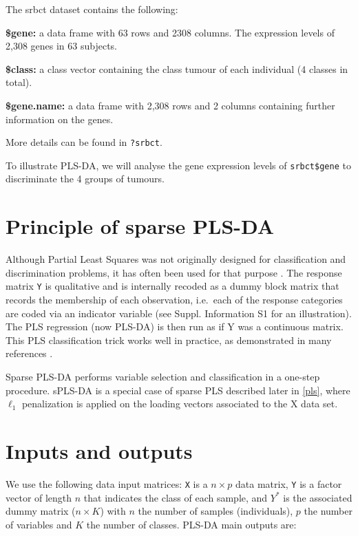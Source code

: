 \documentclass[]{book}
\begin{document}
The srbct dataset contains the following:

\textbf{\$gene:} a data frame with 63 rows and 2308 columns. The expression levels of 2,308 genes in 63 subjects.

\textbf{\$class:} a class vector containing the class tumour of each individual (4 classes in total).

\textbf{\$gene.name:} a data frame with 2,308 rows and 2 columns containing further information on the genes.

More details can be found in \texttt{?srbct}.

To illustrate PLS-DA, we will analyse the gene expression levels of \texttt{srbct\$gene} to discriminate the 4 groups of tumours.

\hypertarget{principle-of-sparse-pls-da}{%
\section{Principle of sparse PLS-DA}\label{principle-of-sparse-pls-da}}

Although Partial Least Squares was not originally designed for classification and discrimination problems, it has often been used for that purpose \citep{Ngu02a, Tan04}. The response matrix \texttt{Y} is qualitative and is internally recoded as a dummy block matrix that records the membership of each observation, i.e.~each of the response categories are coded via an indicator variable (see \citep{mixomics} Suppl. Information S1 for an illustration). The PLS regression (now PLS-DA) is then run as if Y was a continuous matrix. This PLS classification trick works well in practice, as demonstrated in many references \citep{Bar03, Ngu02a, Bou07, Chung10}.

Sparse PLS-DA \citep{Lec11} performs variable selection and classification in a one-step procedure. sPLS-DA is a special case of sparse PLS described later in \ref{pls}, where \(\ell_1\) penalization is applied on the loading vectors associated to the X data set.

\hypertarget{inputs-and-outputs}{%
\section{Inputs and outputs}\label{inputs-and-outputs}}

We use the following data input matrices: \texttt{X} is a \(n \times p\) data matrix, \texttt{Y} is a factor vector of length \(n\) that indicates the class of each sample, and \(Y^*\) is the associated dummy matrix (\(n \times K\)) with \(n\) the number of samples (individuals), \(p\) the number of variables and \(K\) the number of classes. PLS-DA main outputs are:
\end{document}
